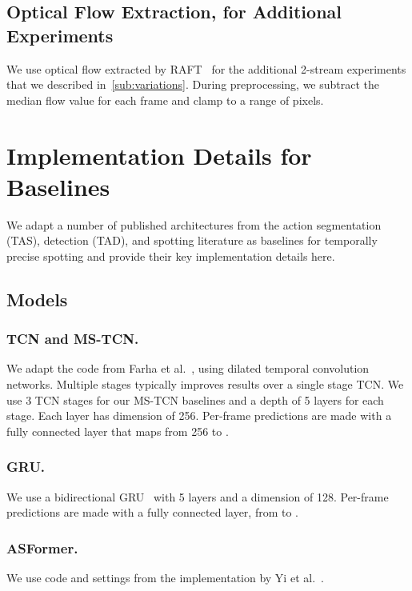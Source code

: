 \documentclass[runningheads]{llncs}
\begin{document}
\subsection{Optical Flow Extraction, for Additional Experiments}

We use optical flow extracted by RAFT~\cite{raft} for the additional 2-stream experiments that we described in~\autoref{sub:variations}.
During preprocessing, we subtract the median flow value for each frame and clamp to a range of  pixels.

\section{Implementation Details for Baselines}
\label{sec:supp_baseline_impl}

We adapt a number of published architectures from the action segmentation (TAS), detection (TAD), and spotting literature as baselines for temporally precise spotting and provide their key implementation details here.

\subsection{Models}
\label{sub:supp_baseline_models}

\subsubsection*{TCN and MS-TCN.}
We adapt the code from Farha et al.~\cite{mstcn}, using dilated temporal convolution networks.
Multiple stages typically improves results over a single stage TCN.
We use 3 TCN stages for our MS-TCN baselines and a depth of 5 layers for each stage.
Each layer has dimension of 256. Per-frame predictions are made with a fully connected layer that maps from 256 to .

\subsubsection*{GRU.}
We use a bidirectional GRU~\cite{gatedrnn} with 5 layers and a dimension  of 128.
Per-frame predictions are made with a fully connected layer, from  to .

\subsubsection*{ASFormer.}
We use code and settings from the implementation by Yi et al.~\cite{asformer}.
\end{document}
